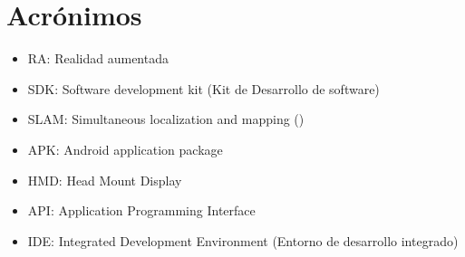 \newpage
\chapter*{Acrónimos}

\begin{itemize}
\item RA: Realidad aumentada
\item SDK: Software development kit (Kit de Desarrollo de software) 
\item SLAM: Simultaneous localization and mapping () 
\item APK: Android application package
\item HMD: Head Mount Display 
\item API: Application Programming Interface 
\item IDE: Integrated Development Environment (Entorno de desarrollo integrado)
\end{itemize}

\noindent
